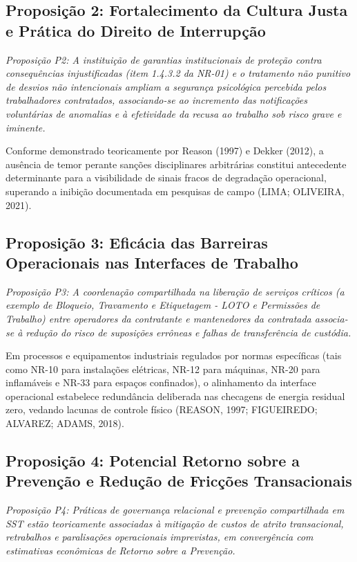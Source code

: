\documentclass[12pt,a4paper]{article}
\begin{document}
\subsection{Proposição 2: Fortalecimento da Cultura Justa e Prática do Direito de Interrupção}
\textit{Proposição P2: A instituição de garantias institucionais de proteção contra consequências injustificadas (item 1.4.3.2 da NR-01) e o tratamento não punitivo de desvios não intencionais ampliam a segurança psicológica percebida pelos trabalhadores contratados, associando-se ao incremento das notificações voluntárias de anomalias e à efetividade da recusa ao trabalho sob risco grave e iminente.}

Conforme demonstrado teoricamente por Reason (1997) e Dekker (2012), a ausência de temor perante sanções disciplinares arbitrárias constitui antecedente determinante para a visibilidade de sinais fracos de degradação operacional, superando a inibição documentada em pesquisas de campo (LIMA; OLIVEIRA, 2021).

\subsection{Proposição 3: Eficácia das Barreiras Operacionais nas Interfaces de Trabalho}
\textit{Proposição P3: A coordenação compartilhada na liberação de serviços críticos (a exemplo de Bloqueio, Travamento e Etiquetagem - LOTO e Permissões de Trabalho) entre operadores da contratante e mantenedores da contratada associa-se à redução do risco de suposições errôneas e falhas de transferência de custódia.}

Em processos e equipamentos industriais regulados por normas específicas (tais como NR-10 para instalações elétricas, NR-12 para máquinas, NR-20 para inflamáveis e NR-33 para espaços confinados), o alinhamento da interface operacional estabelece redundância deliberada nas checagens de energia residual zero, vedando lacunas de controle físico (REASON, 1997; FIGUEIREDO; ALVAREZ; ADAMS, 2018).

\subsection{Proposição 4: Potencial Retorno sobre a Prevenção e Redução de Fricções Transacionais}
\textit{Proposição P4: Práticas de governança relacional e prevenção compartilhada em SST estão teoricamente associadas à mitigação de custos de atrito transacional, retrabalhos e paralisações operacionais imprevistas, em convergência com estimativas econômicas de Retorno sobre a Prevenção.}
\end{document}
